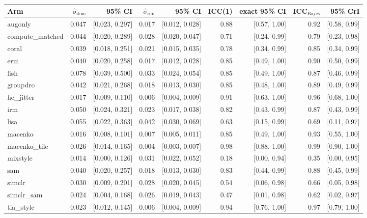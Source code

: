 \begin{tabular}{lrrrrrrrr}
\toprule
Arm & $\hat\sigma_\text{dom}$ & 95\% CI & $\hat\sigma_\text{run}$ & 95\% CI & ICC(1) & exact 95\% CI & ICC$_\text{Bayes}$ & 95\% CrI \\
\midrule
augonly & 0.047 & [0.023, 0.297] & 0.017 & [0.012, 0.028] & 0.88 & [0.57, 1.00] & 0.92 & [0.58, 0.99] \\
compute\_matched & 0.044 & [0.020, 0.289] & 0.028 & [0.020, 0.047] & 0.71 & [0.24, 0.99] & 0.79 & [0.23, 0.98] \\
coral & 0.039 & [0.018, 0.251] & 0.021 & [0.015, 0.035] & 0.78 & [0.34, 0.99] & 0.85 & [0.34, 0.99] \\
erm & 0.040 & [0.020, 0.258] & 0.017 & [0.012, 0.028] & 0.85 & [0.49, 1.00] & 0.90 & [0.50, 0.99] \\
fish & 0.078 & [0.039, 0.500] & 0.033 & [0.024, 0.054] & 0.85 & [0.49, 1.00] & 0.87 & [0.46, 0.99] \\
groupdro & 0.042 & [0.021, 0.268] & 0.018 & [0.013, 0.030] & 0.85 & [0.48, 1.00] & 0.89 & [0.49, 0.99] \\
he\_jitter & 0.017 & [0.009, 0.110] & 0.006 & [0.004, 0.009] & 0.91 & [0.63, 1.00] & 0.96 & [0.68, 1.00] \\
irm & 0.050 & [0.024, 0.321] & 0.023 & [0.017, 0.038] & 0.82 & [0.43, 0.99] & 0.87 & [0.43, 0.99] \\
lisa & 0.055 & [0.022, 0.363] & 0.042 & [0.030, 0.069] & 0.63 & [0.15, 0.99] & 0.69 & [0.11, 0.97] \\
macenko & 0.016 & [0.008, 0.101] & 0.007 & [0.005, 0.011] & 0.85 & [0.49, 1.00] & 0.93 & [0.55, 1.00] \\
macenko\_tile & 0.026 & [0.014, 0.165] & 0.004 & [0.003, 0.007] & 0.98 & [0.88, 1.00] & 0.99 & [0.90, 1.00] \\
mixstyle & 0.014 & [0.000, 0.126] & 0.031 & [0.022, 0.052] & 0.18 & [0.00, 0.94] & 0.35 & [0.00, 0.95] \\
sam & 0.040 & [0.020, 0.257] & 0.018 & [0.013, 0.030] & 0.83 & [0.44, 0.99] & 0.88 & [0.45, 0.99] \\
simclr & 0.030 & [0.009, 0.201] & 0.028 & [0.020, 0.045] & 0.54 & [0.06, 0.98] & 0.66 & [0.05, 0.98] \\
simclr\_sam & 0.024 & [0.004, 0.168] & 0.026 & [0.019, 0.043] & 0.47 & [0.01, 0.98] & 0.62 & [0.02, 0.97] \\
tia\_style & 0.023 & [0.012, 0.145] & 0.006 & [0.004, 0.009] & 0.94 & [0.76, 1.00] & 0.97 & [0.79, 1.00] \\
\bottomrule
\end{tabular}
